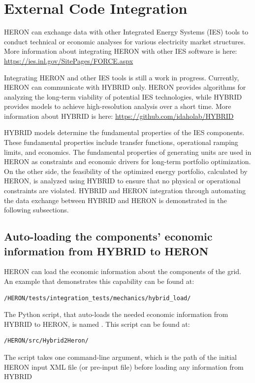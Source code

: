 \section{External Code Integration}
HERON can exchange data with other Integrated Energy Systems (IES) tools to conduct technical or economic analyses for various electricity market structures. More information about integrating HERON with other IES software is here: \url{https://ies.inl.gov/SitePages/FORCE.aspx}

Integrating HERON and other IES tools is still a work in progress. Currently, HERON can communicate with HYBRID only. HERON provides algorithms for analyzing the long-term viability of potential IES technologies, while HYBRID provides models to achieve high-resolution analysis over a short time. More information about HYBRID is here: \url{https://github.com/idaholab/HYBRID}


HYBRID models determine the fundamental properties of the IES components. These fundamental properties include transfer functions, operational ramping limits, and economics. The fundamental properties of generating units are used in HERON as constraints and economic drivers for long-term portfolio optimization. On the other side, the feasibility of the optimized energy portfolio, calculated by HERON, is analyzed using HYBRID to ensure that no physical or operational constraints are violated. HYBRID and HERON integration through automating the data exchange between HYBRID and HERON is demonstrated in the following subsections.

\subsection{Auto-loading the components' economic information from HYBRID to HERON}
HERON can load the economic information about the components of the grid. An example that demonstrates this capability can be found at:
\begin{lstlisting}
/HERON/tests/integration_tests/mechanics/hybrid_load/
\end{lstlisting}

The Python script, that auto-loads the needed economic information from HYBRID to HERON, is named . This script can be found at:
\begin{lstlisting}
/HERON/src/Hybrid2Heron/
\end{lstlisting}


The  script takes one command-line argument, which is the path of the initial HERON input XML file (or pre-input file) before loading any information from HYBRID

